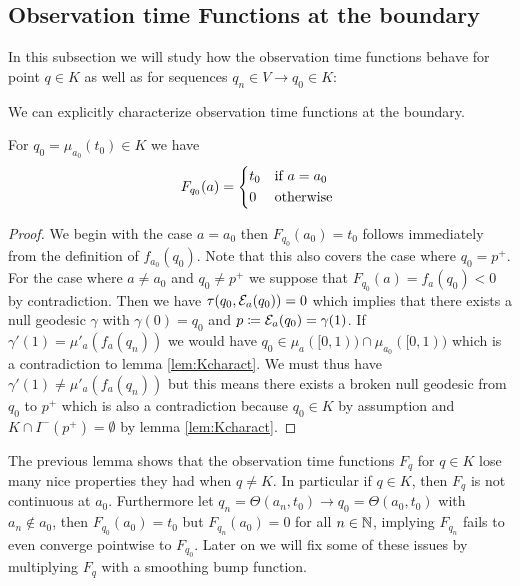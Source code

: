 \subsection{Observation time Functions at the boundary}
In this subsection we will study how the observation time functions behave for point $q\in K$ as well as for sequences $q_n \in V \to q_0\in K$:

We can explicitly characterize observation time functions at the boundary.
\begin{lemma}\label{lem:boundaryF}
    For $q_0=\mu_{a_0}(t_0)\in K$ we have 
    \begin{equation*}
        F_{q_0}(a) = 
        \begin{cases*}
            t_0 & if $a=a_0$ \\
            0 & otherwise
        \end{cases*}
    \end{equation*}
\end{lemma}
\begin{proof}
    We begin with the case $a=a_0$ then $F_{q_0}(a_0)=t_0$ follows immediately from the definition of $f_{a_0}(q_0)$. Note that this also covers the case where $q_0=p^+$. For the case where $a\neq a_0$ and $q_0\neq p^+$ we suppose that $F_{q_0}(a)=f_a(q_0)<0$ by contradiction. Then we have $\tau(q_0,{\mathcal{E}}_a(q_0))=0$ which implies that there exists a null geodesic $\gamma$ with $\gamma(0)=q_0$ and $p\coloneqq {\mathcal{E}}_a(q_0)=\gamma(1)$. If $\gamma'(1)=\mu'_a(f_a(q_n))$ we would have $q_0\in \mu_a([0,1)) \cap \mu_{a_0}([0,1))$ which is a contradiction to lemma \ref{lem:Kcharact}. We must thus have $\gamma'(1)\neq\mu'_a(f_a(q_n))$ but this means there exists a broken null geodesic from $q_0$ to $p^+$ which is also a contradiction because $q_0\in K$ by assumption and $K\cap I^-(p^+)=\emptyset$ by lemma \ref{lem:Kcharact}.
\end{proof}
\begin{remark}
    The previous lemma shows that the observation time functions $F_q$ for $q\in K$ lose many nice properties they had when $q\neq K$. In particular if $q\in K$, then $F_q$ is not continuous at $a_0$. Furthermore let $q_n=\Theta(a_n,t_0)\to q_0=\Theta(a_0,t_0)$ with $a_n \notin a_0$, then $F_{q_0}(a_0)=t_0$ but $F_{q_n}(a_0)=0$ for all $n\in \mathbb{N}$, implying $F_{q_n}$ fails to even converge pointwise to $F_{q_0}$. Later on we will fix some of these issues by multiplying $F_q$ with a smoothing bump function.
\end{remark}

